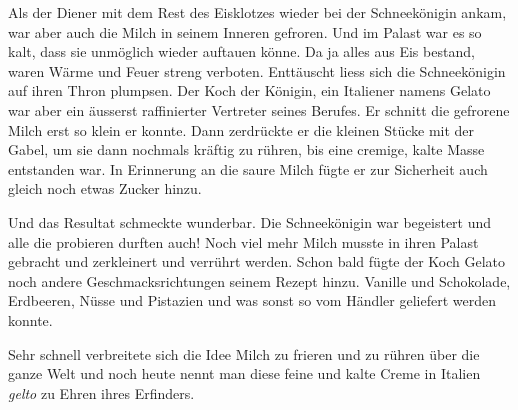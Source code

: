 Als der Diener mit dem Rest des Eisklotzes wieder bei der Schneekönigin ankam, war aber auch die Milch in seinem Inneren gefroren. Und im Palast war es so kalt, dass sie unmöglich wieder auftauen könne. Da ja alles aus Eis bestand, waren Wärme und Feuer streng verboten. Enttäuscht liess sich die Schneekönigin auf ihren Thron plumpsen. Der Koch der Königin, ein Italiener namens Gelato war aber ein äusserst raffinierter Vertreter seines Berufes. Er schnitt die gefrorene Milch erst so klein er konnte. Dann zerdrückte er die kleinen Stücke mit der Gabel, um sie dann nochmals kräftig zu rühren, bis eine cremige, kalte Masse entstanden war. In Erinnerung an die saure Milch fügte er zur Sicherheit auch gleich noch etwas Zucker hinzu.

Und das Resultat schmeckte wunderbar. Die Schneekönigin war begeistert und alle die probieren durften auch! Noch viel mehr Milch musste in ihren Palast gebracht und zerkleinert und verrührt werden. Schon bald fügte der Koch Gelato noch andere Geschmacksrichtungen seinem Rezept hinzu. Vanille und Schokolade, Erdbeeren, Nüsse und Pistazien und was sonst so vom Händler geliefert werden konnte.

Sehr schnell verbreitete sich die Idee Milch zu frieren und zu rühren über die ganze Welt und noch heute nennt man diese feine und kalte Creme in Italien {\it gelto} zu Ehren ihres Erfinders.  \hfill {\color{red}\decofourleft}
